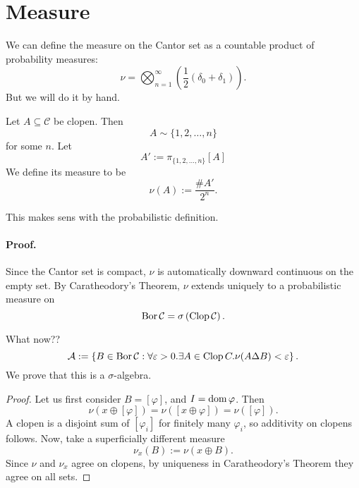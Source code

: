 \section{Measure}

We can define the measure on the Cantor set as a countable product of probability measures:
\[ 
    \nu = \bigotimes_{n=1}^\infty ( \frac{1}{2} (\delta_0 + \delta_1) ).
\]
But we will do it by hand.
\begin{defn}
Let \( A \subseteq \mathcal{C} \) be clopen. Then
\[ 
    A \sim \{1, 2, \ldots, n\} 
\]
for some \( n \). Let
\[ 
    A' := \pi_{\{1, 2, \ldots, n\} }[A]
\]We define its measure to be
\[ 
    \nu (A) := \frac{\# A'}{2^n}.
\]
\end{defn}
This makes sens with the probabilistic definition.


\paragraph{Proof.} Since the Cantor set is compact, \( \nu \) is automatically downward continuous on the empty set. By Caratheodory's Theorem, \( \nu \) extends uniquely to a probabilistic measure on 
\[ 
    \operatorname{Bor} \mathcal{C} = \sigma \left( \operatorname{Clop} \mathcal{C} \right).
\]

What now??
\[ 
    \mathcal{A} := \left\{ B \in \operatorname{Bor} \mathcal{C} : \forall\varepsilon > 0. \exists A \in \operatorname{Clop} C. \nu (A \Delta B) <\varepsilon \right\}.
\]
We prove that this is a \( \sigma \)-algebra.

\begin{proof}
    Let us first consider \( B = \left [ \varphi \right ] \), and \( I = \operatorname{dom} \varphi \). Then
    \[ 
       \nu \left( x \oplus \left[ \varphi \right] \right) = \nu \left( \left[ x \oplus \varphi \right] \right) = \nu \left( \left[ \varphi \right] \right).
   \]
   A clopen is a disjoint sum of \( \left[ \varphi_i \right] \) for finitely many \( \varphi_i \), so additivity on clopens follows. Now, take a superficially different measure
   \[ 
      \nu_x(B) := \nu \left( x \oplus B \right). 
  \]
  Since \( \nu \) and \( \nu_x \) agree on clopens, by uniqueness in Caratheodory's Theorem they agree on all sets.
\end{proof}

